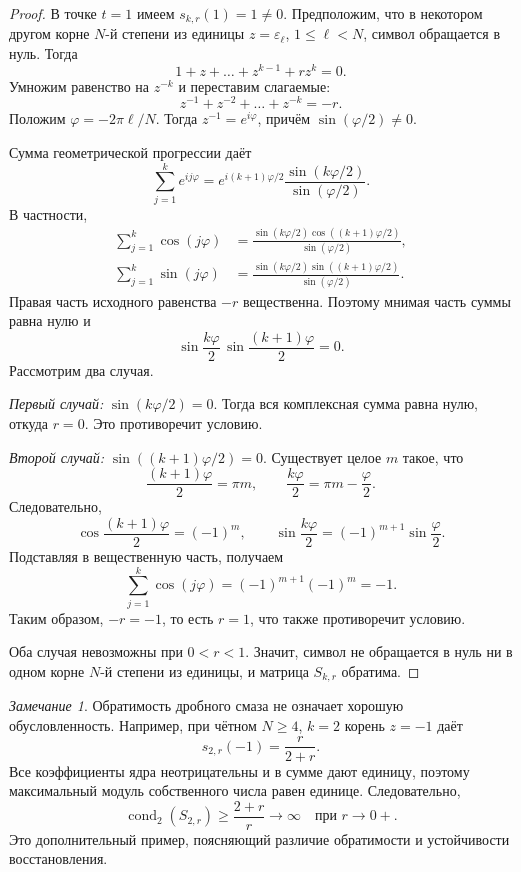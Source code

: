 \documentclass[12pt,a4paper]{article}
\theoremstyle{definition}
\theoremstyle{remark}
\newtheorem*{remark}{Замечание}
\DeclareMathOperator{\cond}{cond}
\newcommand{\eps}{\varepsilon}
\begin{document}
\begin{proof}
В точке $t=1$ имеем $s_{k,r}(1)=1\ne0$. Предположим, что в некотором
другом корне $N$-й степени из единицы $z=\eps_\ell$, $1\leqslant\ell<N$,
символ обращается в нуль. Тогда
\[
  1+z+\dots+z^{k-1}+rz^k=0.
\]
Умножим равенство на $z^{-k}$ и переставим слагаемые:
\[
  z^{-1}+z^{-2}+\dots+z^{-k}=-r.
\]
Положим $\varphi=-2\pi\ell/N$. Тогда $z^{-1}=e^{i\varphi}$, причём
$\sin(\varphi/2)\ne0$.

Сумма геометрической прогрессии даёт
\[
  \sum_{j=1}^{k}e^{ij\varphi}
  =e^{i(k+1)\varphi/2}
    \frac{\sin(k\varphi/2)}{\sin(\varphi/2)}.
\]
В частности,
\begin{align*}
  \sum_{j=1}^k\cos(j\varphi)
    &=\frac{\sin(k\varphi/2)\cos((k+1)\varphi/2)}{\sin(\varphi/2)},\\
  \sum_{j=1}^k\sin(j\varphi)
    &=\frac{\sin(k\varphi/2)\sin((k+1)\varphi/2)}{\sin(\varphi/2)}.
\end{align*}
Правая часть исходного равенства $-r$ вещественна. Поэтому мнимая
часть суммы равна нулю и
\[
  \sin\frac{k\varphi}{2}\,\sin\frac{(k+1)\varphi}{2}=0.
\]
Рассмотрим два случая.

\smallskip\noindent
\emph{Первый случай:} $\sin(k\varphi/2)=0$. Тогда вся комплексная
сумма равна нулю, откуда $r=0$. Это противоречит условию.

\smallskip\noindent
\emph{Второй случай:} $\sin((k+1)\varphi/2)=0$. Существует целое $m$
такое, что
\[
  \frac{(k+1)\varphi}{2}=\pi m,\qquad
  \frac{k\varphi}{2}=\pi m-\frac\varphi2.
\]
Следовательно,
\[
  \cos\frac{(k+1)\varphi}{2}=(-1)^m,\qquad
  \sin\frac{k\varphi}{2}=(-1)^{m+1}\sin\frac\varphi2.
\]
Подставляя в вещественную часть, получаем
\[
  \sum_{j=1}^k\cos(j\varphi)
  =(-1)^{m+1}(-1)^m=-1.
\]
Таким образом, $-r=-1$, то есть $r=1$, что также противоречит условию.

Оба случая невозможны при $0<r<1$. Значит, символ не обращается в нуль
ни в одном корне $N$-й степени из единицы, и матрица $S_{k,r}$ обратима.
\end{proof}

\begin{remark}
Обратимость дробного смаза не означает хорошую обусловленность.
Например, при чётном $N\geqslant4$, $k=2$ корень $z=-1$ даёт
\[
  s_{2,r}(-1)=\frac{r}{2+r}.
\]
Все коэффициенты ядра неотрицательны и в сумме дают единицу,
поэтому максимальный модуль собственного числа равен единице.
Следовательно,
\[
  \cond_2(S_{2,r})\geqslant\frac{2+r}{r}\longrightarrow\infty
  \quad\text{при }r\longrightarrow0+.
\]
Это дополнительный пример, поясняющий различие обратимости и
устойчивости восстановления.
\end{remark}
\end{document}

